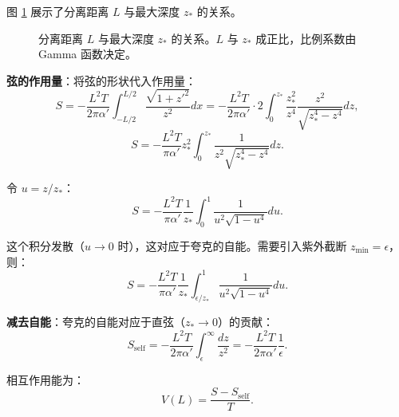 图 \ref{fig:qq_L_z} 展示了分离距离 $L$ 与最大深度 $z_*$ 的关系。

\begin{figure}[htbp]
\centering
{}
\caption{分离距离 $L$ 与最大深度 $z_*$ 的关系。$L$ 与 $z_*$ 成正比，比例系数由 Gamma 函数决定。}
\label{fig:qq_L_z}
\end{figure}

\textbf{弦的作用量}：将弦的形状代入作用量：
\begin{equation}
    S = -\frac{L^2 T}{2\pi \alpha'} \int_{-L/2}^{L/2} \frac{\sqrt{1 + z'^2}}{z^2} dx = -\frac{L^2 T}{2\pi \alpha'} \cdot 2 \int_0^{z_*} \frac{z_*^2}{z^4} \frac{z^2}{\sqrt{z_*^4 - z^4}} dz,
\end{equation}
\begin{equation}
    S = -\frac{L^2 T}{\pi \alpha'} z_*^2 \int_0^{z_*} \frac{1}{z^2 \sqrt{z_*^4 - z^4}} dz.
\end{equation}

令 $u = z/z_*$：
\begin{equation}
    S = -\frac{L^2 T}{\pi \alpha'} \frac{1}{z_*} \int_0^1 \frac{1}{u^2 \sqrt{1 - u^4}} du.
\end{equation}

这个积分发散（$u \to 0$ 时），这对应于夸克的自能。需要引入紫外截断 $z_{\min} = \epsilon$，则：
\begin{equation}
    S = -\frac{L^2 T}{\pi \alpha'} \frac{1}{z_*} \int_{\epsilon/z_*}^1 \frac{1}{u^2 \sqrt{1 - u^4}} du.
\end{equation}

\textbf{减去自能}：夸克的自能对应于直弦（$z_* \to 0$）的贡献：
\begin{equation}
    S_{\text{self}} = -\frac{L^2 T}{2\pi \alpha'} \int_\epsilon^\infty \frac{dz}{z^2} = -\frac{L^2 T}{2\pi \alpha'} \frac{1}{\epsilon}.
\end{equation}

相互作用能为：
\begin{equation}
    V(L) = \frac{S - S_{\text{self}}}{T}.
\end{equation}

